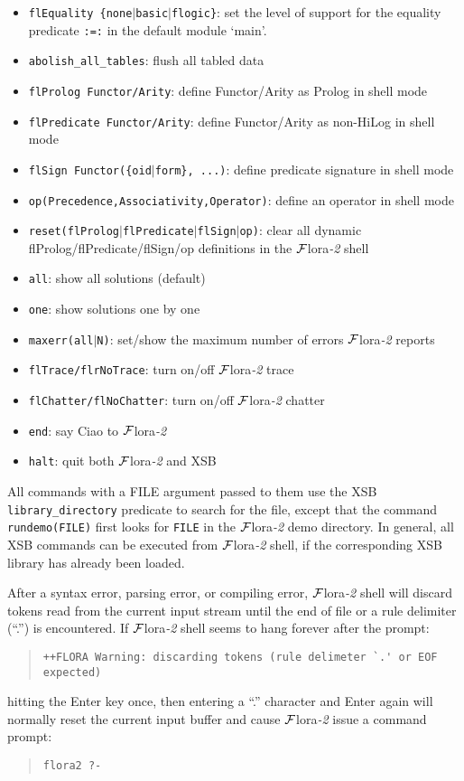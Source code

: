 \documentclass[11pt]{article}
\newcommand{\FLORA}{{\mbox{${\cal F}${\sc lora}\rm\emph{-2}}}\xspace}
\begin{document}
\begin{itemize}
\item {\tt flEquality \{none$|$basic$|$flogic\}}:
    set the level of support for the equality predicate {\tt :=:} in the
    default module `main'.
\item {\tt abolish\_all\_tables}:
    flush all tabled data
\item {\tt flProlog Functor/Arity}:
    define Functor/Arity as Prolog in shell mode
\item {\tt flPredicate Functor/Arity}:
    define Functor/Arity as non-HiLog in shell mode
\item {\tt flSign Functor(\{oid$|$form\}, ...)}:
    define predicate signature in shell mode
\item {\tt op(Precedence,Associativity,Operator)}:
    define an operator in shell mode
\item {\tt reset(flProlog$|$flPredicate$|$flSign$|$op)}:
    clear all dynamic flProlog/flPredicate/flSign/op definitions in the
    \FLORA shell
\item {\tt all}:
    show all solutions (default)
\item {\tt one}:
    show solutions one by one
\item {\tt maxerr(all$|$N)}:
    set/show the maximum number of errors \FLORA reports
\item {\tt flTrace/flrNoTrace}:
    turn on/off \FLORA trace
\item {\tt flChatter/flNoChatter}:
    turn on/off \FLORA chatter
\item {\tt end}:
    say Ciao to \FLORA
\item {\tt halt}:
    quit both \FLORA and XSB
\end{itemize}

All commands with a FILE argument passed to them use the XSB
{\tt library\_directory} predicate to search for the file, except that the
command {\tt rundemo(FILE)} first looks for {\tt FILE} in the \FLORA demo
directory. In general, all XSB commands can be executed from \FLORA shell,
if the corresponding XSB library has already been loaded.

After a syntax error, parsing error, or compiling error, \FLORA shell will
discard tokens read from the current input stream until the end of file or a
rule delimiter (``.'') is encountered. If \FLORA shell seems to hang forever
after the prompt:
\begin{quote}
\begin{verbatim}
++FLORA Warning: discarding tokens (rule delimeter `.' or EOF expected)
\end{verbatim}
\end{quote}
hitting the Enter key once, then entering a ``.'' character and Enter again
will normally reset the current input buffer and cause \FLORA issue a
command prompt:
\begin{quote}
\begin{verbatim}
flora2 ?-
\end{verbatim}
\end{quote}
\end{document}
